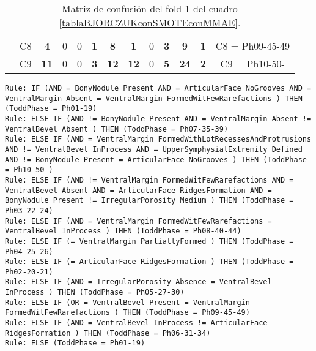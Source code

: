 \begin{table}[H]
{\begin{tabular}{|ccrrrrrrrrrrc|}
\multicolumn{1}{|c|}{}                                      & \multicolumn{1}{c|}{C8} & \multicolumn{1}{c|}{\textbf{4}}  & \multicolumn{1}{c|}{0}          & \multicolumn{1}{c|}{0}          & \multicolumn{1}{c|}{\textbf{1}} & \multicolumn{1}{c|}{\textbf{8}}  & \multicolumn{1}{c|}{\textbf{1}}  & \multicolumn{1}{c|}{0}          & \multicolumn{1}{c|}{\textbf{3}} & \multicolumn{1}{c|}{\textbf{9}}  & \multicolumn{1}{c|}{\textbf{1}} & C8 = Ph09-45-49   \\ \cline{2-13}
\multicolumn{1}{|c|}{}                                      & \multicolumn{1}{c|}{C9} & \multicolumn{1}{c|}{\textbf{11}} & \multicolumn{1}{c|}{0}          & \multicolumn{1}{c|}{0}          & \multicolumn{1}{c|}{\textbf{3}} & \multicolumn{1}{c|}{\textbf{12}} & \multicolumn{1}{c|}{\textbf{12}} & \multicolumn{1}{c|}{0}          & \multicolumn{1}{c|}{\textbf{5}} & \multicolumn{1}{c|}{\textbf{24}} & \multicolumn{1}{c|}{\textbf{2}} & C9 = Ph10-50-     \\ \hline
\end{tabular}%
}
\caption{Matriz de confusión del fold 1 del cuadro \ref{tablaBJORCZUKconSMOTEconMMAE}.}
\end{table}


\begin{lstlisting}
Rule: IF (AND = BonyNodule Present AND = ArticularFace NoGrooves AND = VentralMargin Absent = VentralMargin FormedWitFewRarefactions ) THEN (ToddPhase = Ph01-19)
Rule: ELSE IF (AND != BonyNodule Present AND = VentralMargin Absent != VentralBevel Absent ) THEN (ToddPhase = Ph07-35-39)
Rule: ELSE IF (AND = VentralMargin FormedWithLotRecessesAndProtrusions AND != VentralBevel InProcess AND = UpperSymphysialExtremity Defined AND != BonyNodule Present = ArticularFace NoGrooves ) THEN (ToddPhase = Ph10-50-)
Rule: ELSE IF (AND != VentralMargin FormedWitFewRarefactions AND = VentralBevel Absent AND = ArticularFace RidgesFormation AND = BonyNodule Present != IrregularPorosity Medium ) THEN (ToddPhase = Ph03-22-24)
Rule: ELSE IF (AND = VentralMargin FormedWitFewRarefactions = VentralBevel InProcess ) THEN (ToddPhase = Ph08-40-44)
Rule: ELSE IF (= VentralMargin PartiallyFormed ) THEN (ToddPhase = Ph04-25-26)
Rule: ELSE IF (= ArticularFace RidgesFormation ) THEN (ToddPhase = Ph02-20-21)
Rule: ELSE IF (AND = IrregularPorosity Absence = VentralBevel InProcess ) THEN (ToddPhase = Ph05-27-30)
Rule: ELSE IF (OR = VentralBevel Present = VentralMargin FormedWitFewRarefactions ) THEN (ToddPhase = Ph09-45-49)
Rule: ELSE IF (AND = VentralBevel InProcess != ArticularFace RidgesFormation ) THEN (ToddPhase = Ph06-31-34)
Rule: ELSE (ToddPhase = Ph01-19)
\end{lstlisting}


